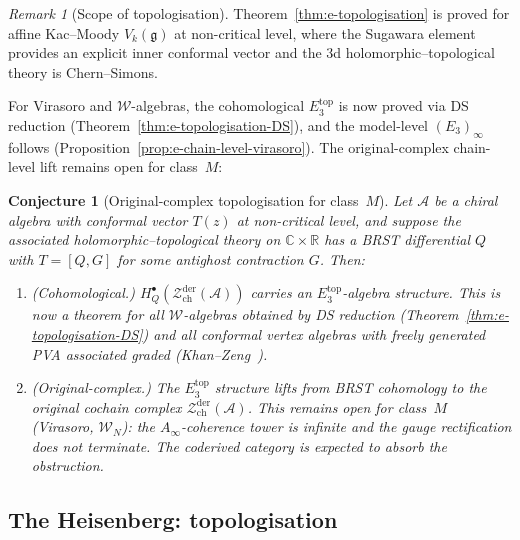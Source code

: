 \documentclass[11pt,reqno]{amsart}
\newtheorem{conjecture}[theorem]{Conjecture}
\theoremstyle{definition}
\theoremstyle{remark}
\newtheorem{remark}[theorem]{Remark}
\providecommand{\cA}{\mathcal{A}}
\providecommand{\cW}{\mathcal{W}}
\providecommand{\cZ}{\mathcal{Z}}
\providecommand{\fg}{\mathfrak{g}}
\providecommand{\Ainf}{A_\infty}
\providecommand{\Ethree}{E_3}
\providecommand{\bC}{\mathbb{C}}
\providecommand{\bR}{\mathbb{R}}
\begin{document}
\begin{remark}[Scope of topologisation]
\label{rem:e-topologisation-scope}
Theorem~\ref{thm:e-topologisation} is proved for affine
Kac--Moody $V_k(\fg)$ at non-critical level, where the Sugawara
element provides an explicit inner conformal vector and the $3$d
holomorphic--topological theory is Chern--Simons.

For Virasoro and $\cW$-algebras, the cohomological
$\Ethree^{\mathrm{top}}$ is now proved via DS reduction
(Theorem~\ref{thm:e-topologisation-DS}), and the
model-level $(\Ethree)_\infty$ follows
(Proposition~\ref{prop:e-chain-level-virasoro}).
The original-complex chain-level lift remains open for
class~$M$:
\end{remark}

\begin{conjecture}[Original-complex topologisation for class~$M$]
\label{conj:e-topologisation-general}
Let $\cA$ be a chiral algebra with conformal vector $T(z)$ at
non-critical level, and suppose the associated
holomorphic--topological theory on $\bC \times \bR$ has a BRST
differential $Q$ with $T = [Q, G]$ for some antighost
contraction $G$. Then:
\begin{enumerate}[label=\textup{(\roman*)}]
\item \textup{(Cohomological.)} $H_Q^\bullet(\cZ^{\mathrm{der}}_{\mathrm{ch}}(\cA))$
carries an $\Ethree^{\mathrm{top}}$-algebra structure.
This is now a theorem for all $\cW$-algebras obtained by
DS reduction \textup{(}Theorem~\ref{thm:e-topologisation-DS}\textup{)}
and all conformal vertex algebras with freely generated PVA
associated graded \textup{(}Khan--Zeng~\cite{KhanZeng25}\textup{)}.
\item \textup{(Original-complex.)} The $\Ethree^{\mathrm{top}}$
structure lifts from BRST cohomology to the original cochain
complex $\cZ^{\mathrm{der}}_{\mathrm{ch}}(\cA)$.
This remains open for class~$M$ \textup{(}Virasoro, $\cW_N$\textup{)}:
the $\Ainf$-coherence tower is infinite and the gauge
rectification does not terminate.
The coderived category is expected to absorb the obstruction.
\end{enumerate}
\end{conjecture}

\subsection{The Heisenberg: topologisation}
\end{document}
